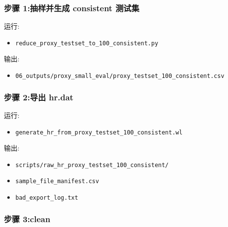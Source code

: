 \documentclass[lang=cn,scheme=chinese,color=blue,device=normal,toc=onecol,math=cm]{elegantbook}
\begin{document}
\subsubsection{步骤 1:抽样并生成 consistent 测试集}


运行:\par


\begin{itemize}
\item \texttt{reduce\_\allowbreak{}proxy\_\allowbreak{}testset\_\allowbreak{}to\_\allowbreak{}100\_\allowbreak{}consistent.py}
\end{itemize}


输出:\par


\begin{itemize}
\item \texttt{06\_\allowbreak{}outputs/\allowbreak{}proxy\_\allowbreak{}small\_\allowbreak{}eval/\allowbreak{}proxy\_\allowbreak{}testset\_\allowbreak{}100\_\allowbreak{}consistent.csv}
\end{itemize}


\subsubsection{步骤 2:导出 hr.dat}


运行:\par


\begin{itemize}
\item \texttt{generate\_\allowbreak{}hr\_\allowbreak{}from\_\allowbreak{}proxy\_\allowbreak{}testset\_\allowbreak{}100\_\allowbreak{}consistent.wl}
\end{itemize}


输出:\par


\begin{itemize}
\item \texttt{scripts/\allowbreak{}raw\_\allowbreak{}hr\_\allowbreak{}proxy\_\allowbreak{}testset\_\allowbreak{}100\_\allowbreak{}consistent/\allowbreak{}}
\item \texttt{sample\_\allowbreak{}file\_\allowbreak{}manifest.csv}
\item \texttt{bad\_\allowbreak{}export\_\allowbreak{}log.txt}
\end{itemize}


\subsubsection{步骤 3:clean}
\end{document}
